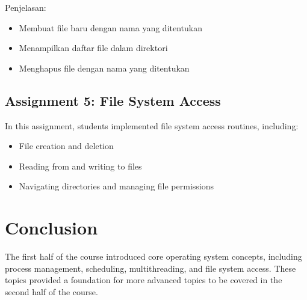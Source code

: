 \documentclass[12pt]{article}
\begin{document}
Penjelasan:
\begin{itemize}
    \item Membuat file baru dengan nama yang ditentukan
    \item Menampilkan daftar file dalam direktori
    \item Menghapus file dengan nama yang ditentukan
\end{itemize}




\subsection{Assignment 5: File System Access}
In this assignment, students implemented file system access routines, including:
\begin{itemize}
    \item File creation and deletion
    \item Reading from and writing to files
    \item Navigating directories and managing file permissions
\end{itemize}


\section{Conclusion}
The first half of the course introduced core operating system concepts, including process management, scheduling, multithreading, and file system access. These topics provided a foundation for more advanced topics to be covered in the second half of the course.
\end{document}
